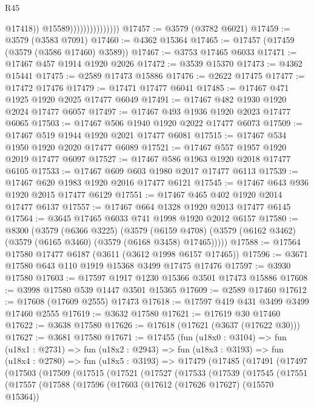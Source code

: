 \begin{lexlean}{R45}
\begin{coremodule}
                                      @17418))
                                  @15589)))))))))))))))
@17457 := @3579 (@3782 @6021)
@17459 := @3579 (@3583 @7091)
@17460 := @4362 @15364
@17465 := @17457 (@17459 (@3579 (@3586 @17460) @3589))
@17467 := @3753 @17465 @6033
@17471 := @17467 @457 @1914 @1920 @2026
@17472 := @3539 @15370
@17473 := @4362 @15441
@17475 := @2589 @17473 @15886
@17476 := @2622 @17475
@17477 := @17472 @17476
@17479 := @17471 @17477 @6041
@17485 := @17467 @471 @1925 @1920 @2025 @17477 @6049
@17491 := @17467 @482 @1930 @1920 @2024 @17477 @6057
@17497 := @17467 @493 @1936 @1920 @2023 @17477 @6065
@17503 := @17467 @506 @1940 @1920 @2022 @17477 @6073
@17509 := @17467 @519 @1944 @1920 @2021 @17477 @6081
@17515 := @17467 @534 @1950 @1920 @2020 @17477 @6089
@17521 := @17467 @557 @1957 @1920 @2019 @17477 @6097
@17527 := @17467 @586 @1963 @1920 @2018 @17477 @6105
@17533 := @17467 @609 @603 @1980 @2017 @17477 @6113
@17539 := @17467 @620 @1983 @1920 @2016 @17477 @6121
@17545 := @17467 @643 @936 @1920 @2015 @17477 @6129
@17551 := @17467 @465 @402 @1920 @2014 @17477 @6137
@17557 := @17467 @664 @1328 @1920 @2013 @17477 @6145
@17564 := @3645 @17465 @6033 @741 @1998 @1920 @2012 @6157
@17580 := @8300
    (@3579
      (@6366 @3225)
      (@3579
        (@6159 @4708)
        (@3579 (@6162 @3462) (@3579 (@6165 @3460) (@3579 (@6168 @3458) @17465)))))
@17588 := @17564 @17580 @17477 @6187 (@3611 (@3612 @1998 @6157 @17465))
@17596 := @3671 @17580 @643 @110 @1919 @15368 @3499 @17475 @17476
@17597 := @3930 @17580
@17603 := @17597 @1917 @1230 @15366 @3501 @17473 @15886
@17608 := @3998 @17580 @539 @1447 @3501 @15365
@17609 := @2589 @17460
@17612 := @17608 (@17609 @2555) @17473
@17618 := @17597 @419 @431 @3499 @3499 @17460 @2555
@17619 := @3632 @17580
@17621 := @17619 @30 @17460
@17622 := @3638 @17580
@17626 := @17618 (@17621 (@3637 (@17622 @30)))
@17627 := @3681 @17580
@17671 := @17455
    (fun (u18x0 : @3104) =>
    fun (u18x1 : @2731) =>
    fun (u18x2 : @2943) =>
    fun (u18x3 : @3193) =>
    fun (u18x4 : @2780) =>
    fun (u18x5 : @3193) =>
    @17479
      (@17485
        (@17491
          (@17497
            (@17503
              (@17509
                (@17515
                  (@17521
                    (@17527
                      (@17533
                        (@17539
                          (@17545
                            (@17551
                              (@17557
                                (@17588
                                  (@17596
                                    (@17603
                                      (@17612 (@17626 @17627) (@15570 @15364))

\end{coremodule}
\end{lexlean}
